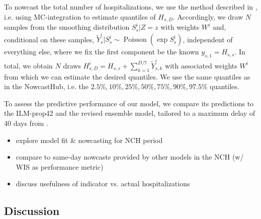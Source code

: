 To nowcast the total number of hospitalizations, we use the method described in , i.e. using MC-integration to estimate quantiles of $H_{s, D}$. Accordingly, we draw $N$ samples from the smoothing distribution $S^{i}_{s} | Z = z$ with weights $W^{i}$ and, conditional on these samples, $\tilde Y^{i}_{s} | S^{i}_s \sim \operatorname{Poisson} \left( \exp S^{i}_s \right)$, independent of everything else, where we fix the first component be the known $y_{s,1} = H_{s,s}$. In total, we obtain $N$ draws $H^{i}_{s,D} = H_{s,s} + \sum_{k = 1}^{D / 7} \tilde Y^{i}_{s,k}$ with associated weights $W^{i}$ from which we can estimate the desired quantiles. We use the same quantiles as in the NowcastHub, i.e. the $2.5\%, 10\%, 25\%, 50\%, 75\%, 90\%, 97.5\%$ quantiles.

To assess the predictive performance of our model, we compare its predictions to the ILM-prop42 and the revised ensemble model, tailored to a maximum delay of 40 days from \citep[Section 3.7]{Wolffram2023Collaborative}. 




\begin{itemize}
    \item explore model fit \& nowcasting for NCH period
    \item compare to same-day nowcasts provided by other models in the NCH (w/ WIS as performance metric)
    \item discuss usefulness of indicator vs. actual hospitalizations
\end{itemize}

\subsection{Discussion}
